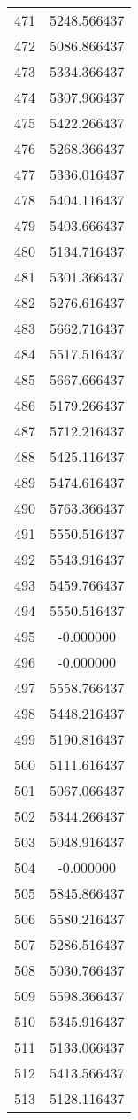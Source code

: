 \documentclass[12pt]{article}
\begin{document}
\begin{longtable}{@{}cc@{}}
471 & 5248.566437 \\
472 & 5086.866437 \\
473 & 5334.366437 \\
474 & 5307.966437 \\
475 & 5422.266437 \\
476 & 5268.366437 \\
477 & 5336.016437 \\
478 & 5404.116437 \\
479 & 5403.666437 \\
480 & 5134.716437 \\
481 & 5301.366437 \\
482 & 5276.616437 \\
483 & 5662.716437 \\
484 & 5517.516437 \\
485 & 5667.666437 \\
486 & 5179.266437 \\
487 & 5712.216437 \\
488 & 5425.116437 \\
489 & 5474.616437 \\
490 & 5763.366437 \\
491 & 5550.516437 \\
492 & 5543.916437 \\
493 & 5459.766437 \\
494 & 5550.516437 \\
495 & -0.000000 \\
496 & -0.000000 \\
497 & 5558.766437 \\
498 & 5448.216437 \\
499 & 5190.816437 \\
500 & 5111.616437 \\
501 & 5067.066437 \\
502 & 5344.266437 \\
503 & 5048.916437 \\
504 & -0.000000 \\
505 & 5845.866437 \\
506 & 5580.216437 \\
507 & 5286.516437 \\
508 & 5030.766437 \\
509 & 5598.366437 \\
510 & 5345.916437 \\
511 & 5133.066437 \\
512 & 5413.566437 \\
513 & 5128.116437 \\

\end{longtable}
\end{document}
